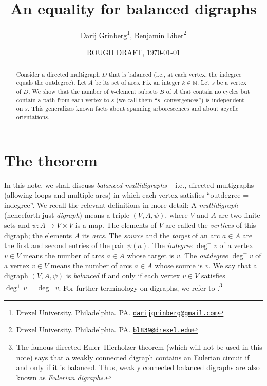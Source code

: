 \documentclass[numbers=enddot,12pt,final,onecolumn,notitlepage]{scrartcl}%
\theoremstyle{definition}
\theoremstyle{plainsl}
\begin{document}
\title{An equality for balanced digraphs}
\author{Darij Grinberg\thanks{Drexel University, Philadelphia, PA.
\href{mailto:darijgrinberg@gmail.com}{\texttt{darijgrinberg@gmail.com}}},
Benjamin Liber\thanks{Drexel University, Philadelphia, PA.
\href{mailto:bl839@drexel.edu}{\texttt{bl839@drexel.edu}}}}
\date{ROUGH DRAFT, \today}
\maketitle

\begin{abstract}
Consider a directed multigraph $D$ that is balanced (i.e., at each vertex, the
indegree equals the outdegree). Let $A$ be its set of arcs. Fix an integer
$k\in\mathbb{N}$. Let $s$ be a vertex of $D$. We show that the number of
$k$-element subsets $B$ of $A$ that contain no cycles but contain a path from
each vertex to $s$ (we call them \textquotedblleft$s$%
-convergences\textquotedblright) is independent on $s$. This generalizes known
facts about spanning arborescences and about acyclic orientations.

\end{abstract}

\section{The theorem}

In this note, we shall discuss \emph{balanced multidigraphs} -- i.e., directed
multigraphs (allowing loops and multiple arcs) in which each vertex satisfies
\textquotedblleft outdegree = indegree\textquotedblright. We recall the
relevant definitions in more detail: A \emph{multidigraph} (henceforth just
\emph{digraph}) means a triple $\left(  V,A,\psi\right)  $, where $V$ and $A$
are two finite sets and $\psi:A\rightarrow V\times V$ is a map. The elements
of $V$ are called the \emph{vertices} of this digraph; the elements $A$ its
\emph{arcs}. The \emph{source} and the \emph{target} of an arc $a\in A$ are
the first and second entries of the pair $\psi\left(  a\right)  $. The
\emph{indegree} $\deg^{-}v$ of a vertex $v\in V$ means the number of arcs
$a\in A$ whose target is $v$. The \emph{outdegree} $\deg^{+}v$ of a vertex
$v\in V$ means the number of arcs $a\in A$ whose source is $v$. We say that a
digraph $\left(  V,A,\psi\right)  $ is \emph{balanced} if and only if each
vertex $v\in V$ satisfies $\deg^{+}v=\deg^{-}v$. For further terminology on
digraphs, we refer to \cite{22s}.\footnote{The famous directed
Euler--Hierholzer theorem (which will not be used in this note) says that a
weakly connected digraph contains an Eulerian circuit if and only if it is
balanced. Thus, weakly connected balanced digraphs are also known as
\emph{Eulerian digraphs}.}
\end{document}

